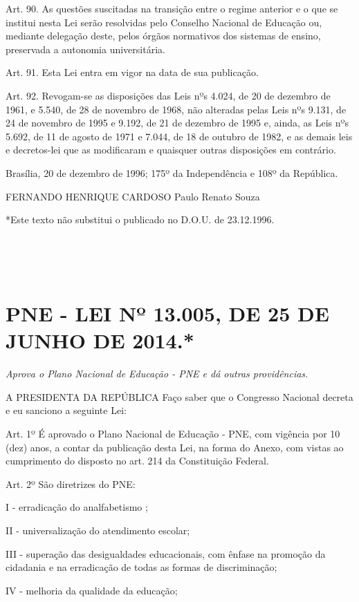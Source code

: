 \documentclass[
]{book}
\begin{document}
Art. 90. As questões suscitadas na transição entre o regime anterior e o que se institui nesta Lei serão resolvidas pelo Conselho Nacional de Educação ou, mediante delegação deste, pelos órgãos normativos dos sistemas de ensino, preservada a autonomia universitária.

Art. 91. Esta Lei entra em vigor na data de sua publicação.

Art. 92. Revogam-se as disposições das Leis nºs 4.024, de 20 de dezembro de 1961, e 5.540, de 28 de novembro de 1968, não alteradas pelas Leis nºs 9.131, de 24 de novembro de 1995 e 9.192, de 21 de dezembro de 1995 e, ainda, as Leis nºs 5.692, de 11 de agosto de 1971 e 7.044, de 18 de outubro de 1982, e as demais leis e decretos-lei que as modificaram e quaisquer outras disposições em contrário.

Brasília, 20 de dezembro de 1996; 175º da Independência e 108º da República.

FERNANDO HENRIQUE CARDOSO
Paulo Renato Souza

*Este texto não substitui o publicado no D.O.U. de 23.12.1996.

~

~

\hypertarget{pne---lei-nuxba-13.005-de-25-de-junho-de-2014.}{%
\section{PNE - LEI Nº 13.005, DE 25 DE JUNHO DE 2014.*}\label{pne---lei-nuxba-13.005-de-25-de-junho-de-2014.}}

\emph{Aprova o Plano Nacional de Educação - PNE e dá outras providências.}

A PRESIDENTA DA REPÚBLICA Faço saber que o Congresso Nacional decreta e eu sanciono a seguinte Lei:

Art. 1º É aprovado o Plano Nacional de Educação - PNE, com vigência por 10 (dez) anos, a contar da publicação desta Lei, na forma do Anexo, com vistas ao cumprimento do disposto no art. 214 da Constituição Federal.

Art. 2º São diretrizes do PNE:

I - erradicação do analfabetismo ;

II - universalização do atendimento escolar;

III - superação das desigualdades educacionais, com ênfase na promoção da cidadania e na erradicação de todas as formas de discriminação;

IV - melhoria da qualidade da educação;
\end{document}
